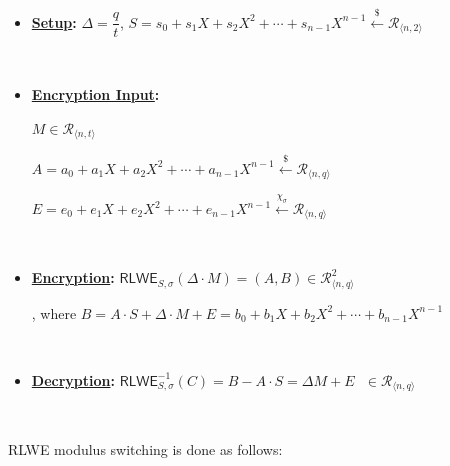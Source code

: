 \begin{itemize}
\item \textbf{\underline{Setup}: } 
$\Delta = \dfrac{q}{t}$, \text{ } $S = s_0 + s_1X + s_2X^2 + \cdots + s_{n-1}X^{n-1} \xleftarrow{\$} \mathcal{R}_{\langle n, 2 \rangle}$

$ $

\item \textbf{\underline{Encryption Input}: } 

$M \in \mathcal{R}_{\langle n, t \rangle}$

$A = a_0 + a_1X + a_2X^2 + \cdots + a_{n-1}X^{n-1} \xleftarrow{\$} \mathcal{R}_{\langle n, q \rangle}$

$E = e_0 + e_1X + e_2X^2 + \cdots + e_{n-1}X^{n-1} \xleftarrow{\chi_\sigma} \mathcal{R}_{\langle n, q \rangle}$ 

$ $

\item \textbf{\underline{Encryption}: } 
$\textsf{RLWE}_{S,\sigma}(\Delta \cdot M) = (A, B) \in \mathcal{R}_{\langle n,q \rangle}^2$ 

, where $B = A \cdot S + \Delta \cdot M + E = b_0 + b_1X + b_2X^2 + \cdots + b_{n-1}X^{n-1}$

$ $

\item \textbf{\underline{Decryption}: } $\textsf{RLWE}^{-1}_{S,\sigma}(C) = B - A \cdot S = \Delta  M + E \text{ } \in \mathcal{R}_{\langle n,q \rangle}$ 
\end{itemize}

$ $

RLWE modulus switching is done as follows:

